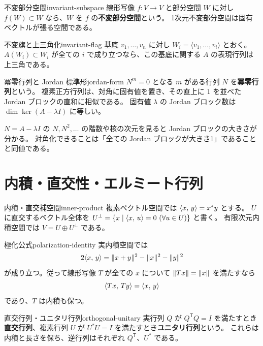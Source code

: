 \begin{definition}{不変部分空間}{invariant-subspace}
線形写像 $f:V\to V$ と部分空間 $W$ に対し $f(W)\subset W$ なら、$W$ を $f$ の\textbf{不変部分空間}という。
1次元不変部分空間は固有ベクトルが張る空間である。
\end{definition}

\begin{proposition}{不変旗と上三角化}{invariant-flag}
基底 $v_1,\ldots,v_n$ に対し $W_i=\langle v_1,\ldots,v_i\rangle$ とおく。
$A(W_i)\subset W_i$ が全ての $i$ で成り立つなら、この基底に関する $A$ の表現行列は上三角である。
\end{proposition}

\begin{definition}{冪零行列と Jordan 標準形}{jordan-form}
$N^m=0$ となる $m$ がある行列 $N$ を\textbf{冪零行列}という。
複素正方行列は、対角に固有値を置き、その直上に $1$ を並べた Jordan ブロックの直和に相似である。
固有値 $\lambda$ の Jordan ブロック数は $\dim\ker(A-\lambda I)$ に等しい。
\end{definition}

\begin{memo*}
$N=A-\lambda I$ の $N,N^2,\ldots$ の階数や核の次元を見ると Jordan ブロックの大きさが分かる。
対角化できることは「全ての Jordan ブロックが大きさ1」であることと同値である。
\end{memo*}

\section{内積・直交性・エルミート行列}

\begin{definition}{内積・直交補空間}{inner-product}
複素ベクトル空間では $\langle x,\, y \rangle=x^*y$ とする。
$U$ に直交するベクトル全体を
$U^\perp=\{x\mid\langle x,\, u \rangle=0\ (\forall u\in U)\}$ と書く。
有限次元内積空間では $V=U\oplus U^\perp$ である。
\end{definition}

\begin{proposition}{極化公式}{polarization-identity}
実内積空間では
\[
2\langle x,\, y \rangle
=\lVert x+y \rVert^2-\lVert x \rVert^2-\lVert y \rVert^2
\]
が成り立つ。従って線形写像 $T$ が全ての $x$ について
$\lVert Tx \rVert=\lVert x \rVert$ を満たすなら
\[
\langle Tx,\, Ty \rangle=\langle x,\, y \rangle
\]
であり、$T$ は内積も保つ。
\end{proposition}

\begin{definition}{直交行列・ユニタリ行列}{orthogonal-unitary}
実行列 $Q$ が $Q^{\mathsf T}Q=I$ を満たすとき\textbf{直交行列}、複素行列 $U$ が $U^*U=I$ を満たすとき\textbf{ユニタリ行列}という。
これらは内積と長さを保ち、逆行列はそれぞれ $Q^{\mathsf T}$、$U^*$ である。
\end{definition}

